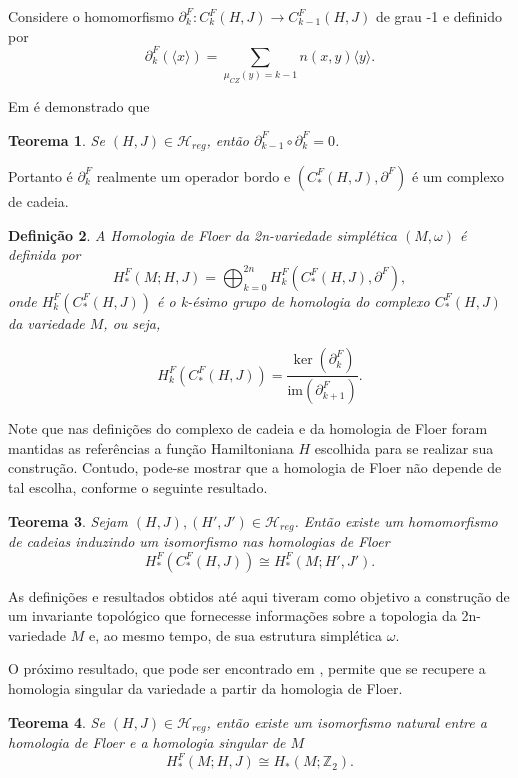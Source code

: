 \documentclass[12pt]{book}
\newtheorem{teorema}{Teorema}[section]
\newtheorem{definicao}[teorema]{Definição}
\newcommand{\bordo}[1]{\partial_{#1}}
\newcommand{\gerador}[1]{\langle #1\rangle}
\newcommand{\hamiltonianasRegulares}{\mathcal{H}_{reg}}
\newcommand{\iconley}[1]{\iconleyabrev(#1)}
\newcommand{\iconleyabrev}{\mu_{CZ}}
\newcommand{\inteiros}{\mathbb{Z}}
\begin{document}
	Considere o homomorfismo $\bordo{k}^{F}: C^{F}_{k}(H,J)\to C^{F}_{k-1}(H,J)$ de grau -1 e definido por
	$$
	\bordo{k}^{F}(\gerador{x}) = \sum_{\iconley{y}=k-1}n(x,y)\gerador{y}.
	$$
	
	Em \cite{audi_floer_homology} é demonstrado que 
	
	\begin{teorema}
		Se $(H,J)\in \hamiltonianasRegulares$, então $\partial^{F}_{k-1}\circ \partial^{F}_{k} = 0$.
	\end{teorema}
	
	Portanto é $\partial^{F}_{k}$ realmente um operador bordo e $(C^{F}_{*}(H,J), \partial^{F})$ é um complexo de cadeia.
	
	\begin{definicao}
			A Homologia de Floer da 2n-variedade simplética $(M,\omega)$ é definida por 
			$$
			H^{F}_{*}(M;H,J)=\bigoplus_{k=0}^{2n}H^{F}_{k}(C^{F}_{*}(H,J), \partial^{F}),
			$$
			onde $H^{F}_{k}(C^{F}_{*}(H,J))$ é o k-ésimo grupo de homologia do complexo $C^{F}_{*}(H,J)$ da variedade $M$, ou seja,
			
			$$
			H^{F}_{k}(C^{F}_{*}(H,J)) = \frac{\ker(\partial^{F}_{k})}{\text{im}(\partial^{F}_{k+1})}.
			$$ 
	\end{definicao}
	
	Note que nas definições do complexo de cadeia e da homologia de Floer foram mantidas as referências a função Hamiltoniana $H$ escolhida para se realizar sua construção. Contudo,  pode-se mostrar que a homologia de Floer não depende de tal escolha, conforme o seguinte resultado.
	
	\begin{teorema}
		Sejam $(H,J), (H',J') \in \hamiltonianasRegulares$. Então existe um homomorfismo de cadeias induzindo um isomorfismo nas homologias de Floer
		$$
		H^{F}_{*}(C^{F}_{*}(H,J)) \cong H^{F}_{*}(M; H',J'). 
		$$
	\end{teorema}
	
	As definições e resultados obtidos até aqui tiveram como objetivo a construção de um invariante topológico que fornecesse informações sobre a topologia da 2n-variedade $M$ e, ao mesmo tempo, de sua estrutura simplética $\omega$.
	
	O próximo resultado, que pode ser encontrado em \cite{salamon_zehnder}, permite que se recupere a homologia singular da variedade a partir da homologia de Floer.
	
	\begin{teorema}\label{teorema_isomorfismo_homologia_floer}
		Se $(H,J) \in \hamiltonianasRegulares$, então 
		existe um isomorfismo natural entre a homologia de Floer e a homologia singular de $M$
		$$
		H^{F}_{*}(M;H,J) \cong H_{*}(M;\inteiros_{2}). 
		$$
		
	\end{teorema}
	
\end{document}
